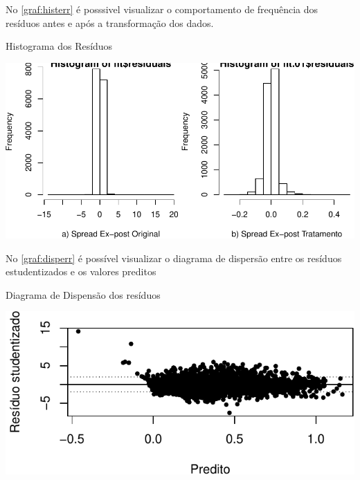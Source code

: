 \documentclass[
  12pt,
  12pt,
  openright,
  oneside,
  a4paper,
  chapter=TITLE,
  section=TITLE,
  subsection=TITLE,
  subsubsection=TITLE,
  english,
  portugues,
  sumario=tradicional]{abntex2}
\begin{document}
No \autoref{graf:histerr} é posssivel visualizar o comportamento de frequência dos resíduos antes e após a transformação dos dados.

\begin{grafico}[!hbtp]
\vspace{20pt}
\caption{Histograma dos Resíduos}
\vspace{-4mm}

\begin{center}\includegraphics[width=1\linewidth]{12-exportedfigures/hist.residuals-1} \end{center}
\vspace{3mm}
\label{graf:histerr}
\vspace{-2mm}
\end{grafico}

No \autoref{graf:disperr} é possível visualizar o diagrama de dispersão entre os resíduos estudentizados e os valores preditos

\begin{grafico}[!hbtp]
\caption{Diagrama de Dispensão dos resíduos}
\vspace{-4mm}

\begin{center}\includegraphics{12-exportedfigures/erros.disp-1} \end{center}
\vspace{3mm}
\label{graf:disperr}
\vspace{-2mm}
\end{grafico}
\end{document}
